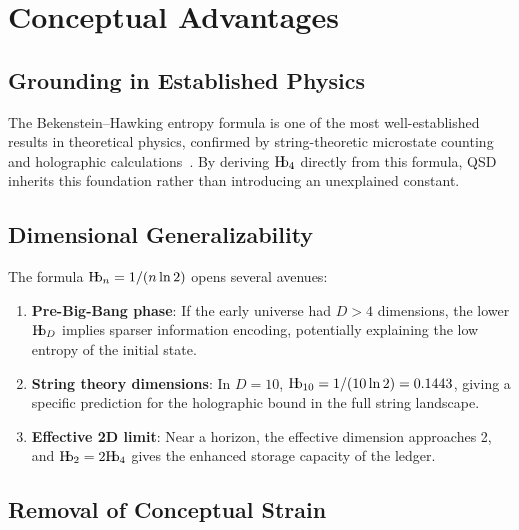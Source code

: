 \documentclass[11pt,a4paper]{article}
\theoremstyle{plain}
\theoremstyle{definition}
\newcommand{\Hb}{\textnormal{H\kern-0.3em b}}
\newcommand{\Hbn}{\Hb_n}
\newcommand{\Hbfour}{\Hb_4}
\newcommand{\Hbtwo}{\Hb_2}
\begin{document}
\section{Conceptual Advantages}
\label{sec:advantages}

\subsection{Grounding in Established Physics}

The Bekenstein--Hawking entropy formula is one of the most well-established results in theoretical physics, confirmed by string-theoretic microstate counting~\cite{Strominger1996} and holographic calculations~\cite{Maldacena1999}. By deriving $\Hbfour$ directly from this formula, QSD inherits this foundation rather than introducing an unexplained constant.

\subsection{Dimensional Generalizability}

The formula $\Hbn = 1/(n\ln 2)$ opens several avenues:

\begin{enumerate}
    \item \textbf{Pre-Big-Bang phase}: If the early universe had $D > 4$ dimensions, the lower $\Hb_D$ implies sparser information encoding, potentially explaining the low entropy of the initial state.
    
    \item \textbf{String theory dimensions}: In $D=10$, $\Hb_{10} = 1/(10\ln 2) = 0.1443$, giving a specific prediction for the holographic bound in the full string landscape.
    
    \item \textbf{Effective 2D limit}: Near a horizon, the effective dimension approaches 2, and $\Hbtwo = 2\Hbfour$ gives the enhanced storage capacity of the ledger.
\end{enumerate}

\subsection{Removal of Conceptual Strain}
\end{document}
